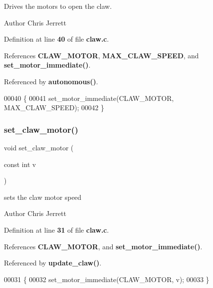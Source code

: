 Drives the motors to open the claw. 

\begin{DoxyAuthor}{Author}
Chris Jerrett 
\end{DoxyAuthor}


Definition at line \textbf{ 40} of file \textbf{ claw.\+c}.



References \textbf{ C\+L\+A\+W\+\_\+\+M\+O\+T\+OR}, \textbf{ M\+A\+X\+\_\+\+C\+L\+A\+W\+\_\+\+S\+P\+E\+ED}, and \textbf{ set\+\_\+motor\+\_\+immediate()}.



Referenced by \textbf{ autonomous()}.


\begin{DoxyCode}
00040                  \{
00041   set_motor_immediate(CLAW_MOTOR, MAX_CLAW_SPEED);
00042 \}
\end{DoxyCode}
\mbox{\label{claw_8c_a3a57f998b1884d39b0cc786689f7086f}} 
\subsubsection{set\+\_\+claw\+\_\+motor()}
{\footnotesize\ttfamily void set\+\_\+claw\+\_\+motor (\begin{DoxyParamCaption}\item[{const int}]{v }\end{DoxyParamCaption})}



sets the claw motor speed 

\begin{DoxyAuthor}{Author}
Chris Jerrett 
\end{DoxyAuthor}


Definition at line \textbf{ 31} of file \textbf{ claw.\+c}.



References \textbf{ C\+L\+A\+W\+\_\+\+M\+O\+T\+OR}, and \textbf{ set\+\_\+motor\+\_\+immediate()}.



Referenced by \textbf{ update\+\_\+claw()}.


\begin{DoxyCode}
00031                                 \{
00032   set_motor_immediate(CLAW_MOTOR, v);
00033 \}
\end{DoxyCode}
\mbox{\label{claw_8c_a0122b78972344264b8a276a559cfce4a}} 

